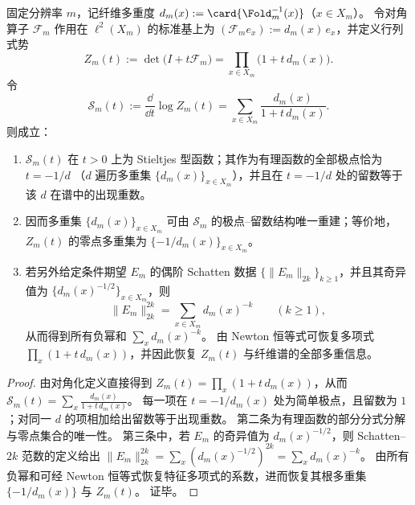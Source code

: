 \begin{theorem}\label{thm:pom-fiber-spectrum-stieltjes-rigidity-determinant-schatten}
固定分辨率 \(m\)，记纤维多重度 \(d_m(x):=\card{\Fold_m^{-1}(x)}\)（\(x\in X_m\)）。
令对角算子 \(\mathcal F_m\) 作用在 \(\ell^2(X_m)\) 的标准基上为
\(
(\mathcal F_m e_x):=d_m(x)\,e_x
\)，并定义行列式势
\[
Z_m(t):=\det\!\bigl(I+t\mathcal F_m\bigr)=\prod_{x\in X_m}\bigl(1+t\,d_m(x)\bigr).
\]
令
\[
\mathcal S_m(t):=\frac{\dd}{\dd t}\log Z_m(t)=\sum_{x\in X_m}\frac{d_m(x)}{1+t\,d_m(x)}.
\]
则成立：
\begin{enumerate}
  \item \(\mathcal S_m(t)\) 在 \(t>0\) 上为 Stieltjes 型函数；其作为有理函数的全部极点恰为
  \(
  t=-1/d
  \)
  （\(d\) 遍历多重集 \(\{d_m(x)\}_{x\in X_m}\)），并且在 \(t=-1/d\) 处的留数等于该 \(d\) 在谱中的出现重数。
  \item 因而多重集 \(\{d_m(x)\}_{x\in X_m}\) 可由 \(\mathcal S_m\) 的极点--留数结构唯一重建；等价地，\(Z_m(t)\) 的零点多重集为 \(\{-1/d_m(x)\}_{x\in X_m}\)。
  \item 若另外给定条件期望 \(E_m\) 的偶阶 Schatten 数据 \(\{\|E_m\|_{2k}\}_{k\ge 1}\)，并且其奇异值为 \(\{d_m(x)^{-1/2}\}_{x\in X_m}\)，则
  \[
  \|E_m\|_{2k}^{2k}=\sum_{x\in X_m}d_m(x)^{-k}\qquad(k\ge 1),
  \]
  从而得到所有负幂和 \(\sum_x d_m(x)^{-k}\)。
  由 Newton 恒等式可恢复多项式 \(\prod_x(1+t\,d_m(x))\)，并因此恢复 \(Z_m(t)\) 与纤维谱的全部多重信息。
\end{enumerate}
\end{theorem}

\begin{proof}
由对角化定义直接得到
\(
Z_m(t)=\prod_x(1+t\,d_m(x))
\)，从而
\(
\mathcal S_m(t)=\sum_x \frac{d_m(x)}{1+t\,d_m(x)}
\)。
每一项在 \(t=-1/d_m(x)\) 处为简单极点，且留数为 \(1\)；对同一 \(d\) 的项相加给出留数等于出现重数。
第二条为有理函数的部分分式分解与零点集合的唯一性。
第三条中，若 \(E_m\) 的奇异值为 \(d_m(x)^{-1/2}\)，则 Schatten--\(2k\) 范数的定义给出
\(
\|E_m\|_{2k}^{2k}=\sum_x (d_m(x)^{-1/2})^{2k}=\sum_x d_m(x)^{-k}
\)。
由所有负幂和可经 Newton 恒等式恢复特征多项式的系数，进而恢复其根多重集 \(\{-1/d_m(x)\}\) 与 \(Z_m(t)\)。
证毕。
\end{proof}

\endinput
